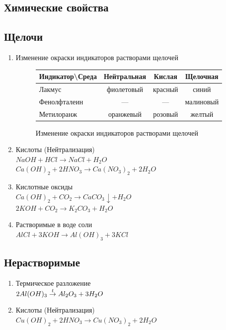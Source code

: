 \subsection{Химические свойства}
\subsection{Щелочи}
\begin{enumerate}
    \item Изменение окраски индикаторов растворами щелочей
        \begin{figure*}[h!]
            \centering
            \begin{tabular}[b]{| l | c | c | c |}
                \hline
                Индикатор\textbackslash Среда & Нейтральная & Кислая & Щелочная \\
                \hline
                Лакмус & фиолетовый & красный & синий \\
                \hline
                Фенолфталеин & --- & --- & малиновый \\
                \hline
                Метилоранж & оранжевый & розовый & желтый \\
                \hline
            \end{tabular}
            \caption{Изменение окраски индикаторов растворами щелочей}
        \end{figure*}

    \item Кислоты (Нейтрализация)\\
        $NaOH + HCl \rightarrow NaCl + H_2O$\\
        $Ca(OH)_2 + 2HNO_3 \rightarrow Ca(NO_3)_2 + 2H_2O$

    \item Кислотные оксиды\\
        $Ca(OH)_2 + CO_2 \rightarrow CaCO_3\downarrow + H_2O$\\
        $2KOH + CO_2 \rightarrow K_2CO_3 + H_2O$

    \item Растворимые в воде соли\\
        $AlCl + 3KOH \rightarrow Al(OH)_3 + 3KCl$

\end{enumerate}


\subsection{Нерастворимые}
\begin{enumerate}
    \item Термическое разложение \\
        $2Al(OH)_3 \stackrel{t}{\rightarrow} Al_2O_3 + 3H_2O$

    \item Кислоты (Нейтрализация)\\
        $Cu(OH)_2 + 2HNO_3 \rightarrow Cu(NO_3)_2 + 2H_2O$
\end{enumerate}
